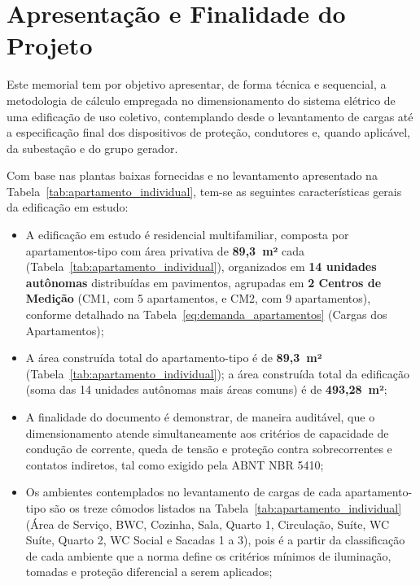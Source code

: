 \documentclass[12pt,openright,oneside,a4paper,brazil]{abntex2}
\begin{document}
\section{Apresentação e Finalidade do Projeto}

\hspace{1.27cm}Este memorial tem por objetivo apresentar, de forma técnica e sequencial, a
metodologia de cálculo empregada no dimensionamento do sistema elétrico de
uma edificação de uso coletivo, contemplando desde o levantamento de cargas
até a especificação final dos dispositivos de proteção, condutores e,
quando aplicável, da subestação e do grupo gerador.

Com base nas plantas baixas fornecidas e no levantamento apresentado na
Tabela~\ref{tab:apartamento_individual}, tem-se as seguintes características gerais da
edificação em estudo:

\begin{itemize}[leftmargin=1.2cm]
    \item A edificação em estudo é residencial multifamiliar, composta por
    apartamentos-tipo com área privativa de \textbf{89,3~m²} cada
    (Tabela~\ref{tab:apartamento_individual}), organizados em \textbf{14 unidades
    autônomas} distribuídas em pavimentos, agrupadas em \textbf{2 Centros
    de Medição} (CM1, com 5 apartamentos, e CM2, com 9 apartamentos),
    conforme detalhado na Tabela~\ref{eq:demanda_apartamentos} (Cargas dos Apartamentos);
    \item A área construída total do apartamento-tipo é de
    \textbf{89,3~m²} (Tabela~\ref{tab:apartamento_individual}); a área construída total da
    edificação (soma das 14 unidades autônomas mais áreas comuns) é de \textbf{493,28~m²};
    \item A finalidade do documento é demonstrar, de maneira auditável, que
    o dimensionamento atende simultaneamente aos critérios de
    {capacidade de condução de corrente}, {queda de tensão} e
    {proteção contra sobrecorrentes e contatos indiretos}, tal como
    exigido pela ABNT NBR 5410;
    \item Os ambientes contemplados no levantamento de cargas de cada
    apartamento-tipo são os treze cômodos listados na
    Tabela~\ref{tab:apartamento_individual} (Área de Serviço, BWC, Cozinha, Sala, Quarto
    1, Circulação, Suíte, WC Suíte, Quarto 2, WC Social e Sacadas 1 a 3),
    pois é a partir da classificação de cada ambiente que a norma define os
    critérios mínimos de iluminação, tomadas e proteção diferencial a
    serem aplicados;
    
\end{itemize}
\end{document}
